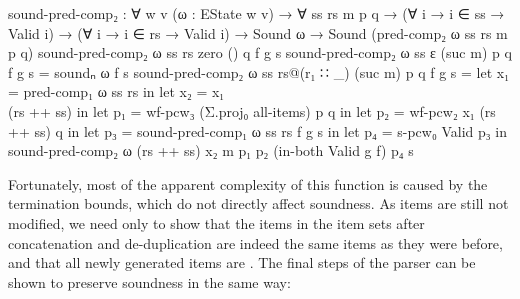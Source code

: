 		\begin{code}
			  sound-pred-comp₂ : ∀ {w v} (ω : EState w v) → ∀ ss rs m p q →
			    (∀ {i} → i ∈ ss → Valid i) →
			    (∀ {i} → i ∈ rs → Valid i) →
			    Sound ω → Sound (pred-comp₂ ω ss rs m p q)
			  sound-pred-comp₂ ω ss rs zero () q f g s
			  sound-pred-comp₂ ω ss ε (suc m) p q f g s = soundₙ ω f s
			  sound-pred-comp₂ ω ss rs@(r₁ ∷ _) (suc m) p q f g s =
			    let x₁ = pred-comp₁ ω ss rs in
			    let x₂ = x₁ \\ (rs ++ ss) in
			    let p₁ = wf-pcw₃ (Σ.proj₀ all-items) p q  in
			    let p₂ = wf-pcw₂ x₁ (rs ++ ss) q in
			    let p₃ = sound-pred-comp₁ ω ss rs f g s in
			    let p₄ = s-pcw₀ Valid p₃ in
			    sound-pred-comp₂ ω (rs ++ ss) x₂ m p₁ p₂ (in-both Valid g f) p₄ s
		\end{code}

		Fortunately, most of the apparent complexity of this function is caused
		by the termination bounds, which do not directly affect soundness. As
		items are still not modified, we need only to show that the items in
		the item sets after concatenation and de-duplication are indeed the
		same items as they were before, and that all newly generated items are
		. The final steps of the parser can be shown to preserve
		soundness in the same way:

